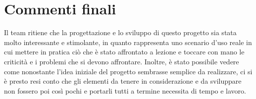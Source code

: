 \documentclass[italian]{report}
\begin{document}
\section{Commenti finali}
Il team ritiene che la progettazione e lo sviluppo di questo progetto sia stata molto interessante e stimolante, in quanto rappresenta uno scenario d'uso reale in cui mettere in pratica ciò che è stato affrontato a lezione e toccare con mano le criticità e i problemi che si devono affrontare. Inoltre, è stato possibile vedere come nonostante l'idea iniziale del progetto sembrasse semplice da realizzare, ci si è presto resi conto che gli elementi da tenere in considerazione e da sviluppare non fossero poi così pochi e portarli tutti a termine necessita di tempo e lavoro. 
\end{document}
